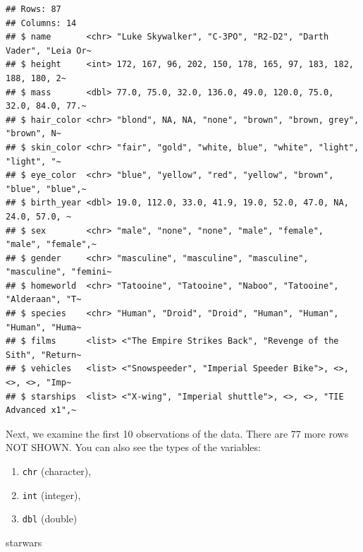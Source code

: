 \documentclass[
]{book}
\makeatletter
\newenvironment{Shaded}{\begin{snugshade}}{\end{snugshade}}
\newcommand{\NormalTok}[1]{#1}
\providecommand{\tightlist}{%
  \setlength{\itemsep}{0pt}\setlength{\parskip}{0pt}}
\newenvironment{kframe}{%
\medskip{}
\setlength{\fboxsep}{.8em}
 \def\at@end@of@kframe{}%
 \ifinner\ifhmode%
  \def\at@end@of@kframe{\end{minipage}}%
  \begin{minipage}{\columnwidth}%
 \fi\fi%
 \def\FrameCommand##1{\hskip\@totalleftmargin \hskip-\fboxsep
 \colorbox{shadecolor}{##1}\hskip-\fboxsep
     \hskip-\linewidth \hskip-\@totalleftmargin \hskip\columnwidth}%
 \MakeFramed {\advance\hsize-\width
   \@totalleftmargin\z@ \linewidth\hsize
   \@setminipage}}%
 {\par\unskip\endMakeFramed%
 \at@end@of@kframe}
\renewenvironment{Shaded}{\begin{kframe}}{\end{kframe}}
\makeatother
\begin{document}
\begin{verbatim}
## Rows: 87
## Columns: 14
## $ name       <chr> "Luke Skywalker", "C-3PO", "R2-D2", "Darth Vader", "Leia Or~
## $ height     <int> 172, 167, 96, 202, 150, 178, 165, 97, 183, 182, 188, 180, 2~
## $ mass       <dbl> 77.0, 75.0, 32.0, 136.0, 49.0, 120.0, 75.0, 32.0, 84.0, 77.~
## $ hair_color <chr> "blond", NA, NA, "none", "brown", "brown, grey", "brown", N~
## $ skin_color <chr> "fair", "gold", "white, blue", "white", "light", "light", "~
## $ eye_color  <chr> "blue", "yellow", "red", "yellow", "brown", "blue", "blue",~
## $ birth_year <dbl> 19.0, 112.0, 33.0, 41.9, 19.0, 52.0, 47.0, NA, 24.0, 57.0, ~
## $ sex        <chr> "male", "none", "none", "male", "female", "male", "female",~
## $ gender     <chr> "masculine", "masculine", "masculine", "masculine", "femini~
## $ homeworld  <chr> "Tatooine", "Tatooine", "Naboo", "Tatooine", "Alderaan", "T~
## $ species    <chr> "Human", "Droid", "Droid", "Human", "Human", "Human", "Huma~
## $ films      <list> <"The Empire Strikes Back", "Revenge of the Sith", "Return~
## $ vehicles   <list> <"Snowspeeder", "Imperial Speeder Bike">, <>, <>, <>, "Imp~
## $ starships  <list> <"X-wing", "Imperial shuttle">, <>, <>, "TIE Advanced x1",~
\end{verbatim}

Next, we examine the first 10 observations of the data. There are 77 more rows NOT SHOWN. You can also see the types of the variables:

\begin{enumerate}
\def\labelenumi{\arabic{enumi}.}
\tightlist
\item
  \texttt{chr} (character),
\item
  \texttt{int} (integer),
\item
  \texttt{dbl} (double)
\end{enumerate}

\begin{Shaded}
\begin{Highlighting}[]
\NormalTok{starwars}
\end{Highlighting}
\end{Shaded}
\end{document}
